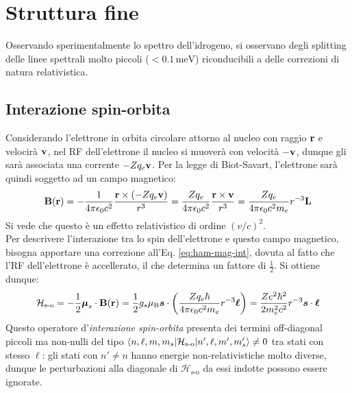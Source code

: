 \section{Struttura fine}

Osservando sperimentalmente lo spettro dell'idrogeno, si osservano degli splitting delle linee spettrali molto piccoli ($ < 0.1 \,\text{meV} $) riconducibili a delle correzioni di natura relativistica.

\subsection{Interazione spin-orbita}

Considerando l'elettrone in orbita circolare attorno al nucleo con raggio $ \mathbf{r} $ e velocirà $ \mathbf{v} $, nel RF dell'elettrone il nucleo si muoverà con velocità $ -\mathbf{v} $, dunque gli sarà associata una corrente $ -Zq_e \mathbf{v} $. Per la legge di Biot-Savart, l'elettrone sarà quindi soggetto ad un campo magnetico:
\begin{equation*}
	\mathbf{B}(\mathbf{r}) = - \frac{1}{4\pi \epsilon_0 c^2} \frac{\mathbf{r} \times (-Zq_e \mathbf{v})}{r^3} = \frac{Zq_e}{4\pi \epsilon_0 c^2} \frac{\mathbf{r} \times \mathbf{v}}{r^3} = \frac{Zq_e}{4\pi \epsilon_0 c^2 m_e} r^{-3} \mathbf{L}
\end{equation*}
Si vede che questo è un effetto relativistico di ordine $ (v/c)^2 $.\\
Per descrivere l'interazione tra lo spin dell'elettrone e questo campo magnetico, bisogna apportare una correzione all'Eq. \ref{eq:ham-mag-int}, dovuta al fatto che l'RF dell'elettrone è accellerato, il che determina un fattore di $ \frac{1}{2} $. Si ottiene dunque:
\begin{equation*}
	\mathcal{H}_\text{s-o} = - \frac{1}{2} \boldsymbol{\mu}_s \cdot \mathbf{B}(\mathbf{r}) = \frac{1}{2} g_s \mu_\text{B} \boldsymbol{s} \cdot \left( \frac{Zq_e \hbar}{4\pi \epsilon_0 c^2 m_e} r^{-3} \boldsymbol{\ell} \right) = \frac{Ze^2 \hbar^2}{2m_e^2 c^2} r^{-3} \boldsymbol{s} \cdot \boldsymbol{\ell}
\end{equation*}
Questo operatore d'\textit{interazione spin-orbita} presenta dei termini off-diagonal piccoli ma non-nulli del tipo $ \braket{n,\ell,m,m_s | \mathcal{H}_\text{s-o} | n',\ell,m',m_s'} \neq 0 $ tra stati con stesso $ \ell $: gli stati con $ n' \neq n $ hanno energie non-relativistiche molto diverse, dunque le perturbazioni alla diagonale di $ \mathcal{H}_\text{s-o} $ da essi indotte possono essere ignorate. 

